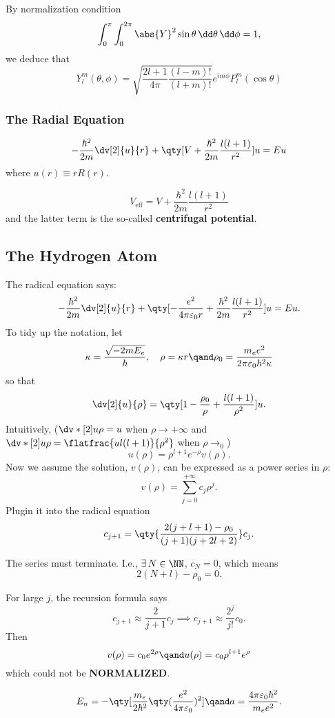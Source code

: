 By normalization condition
\[
	\int_{0}^{\pi} \int_0^{2\pi} \abs{Y}^2\sin\theta \,\dd \theta\,\dd\phi=1
,\] 
we deduce that
\begin{equation}
    Y^m_l(\theta,\phi)
	=
	\sqrt{\frac{2l+1}{4\pi}\frac{(l-m)!}{(l+m)!}}e^{im\phi}P^m_l(\cos\theta)
	\label{yml}
\end{equation}
\subsubsection{The Radial Equation}
\begin{thm}
	\[
		-\frac{\hbar^2}{2m}\dv[2]{u}{r}+\qty[V+\frac{\hbar^2}{2m}\frac{l(l+1)}{r^2}]u=Eu
	\] 
	where $u(r)\equiv rR(r)$.
\end{thm}
\begin{remark}
	\[
		V_{\mathrm{eff}}=V+\frac{\hbar^2}{2m}\frac{l(l+1)}{r^2}
	\] and the latter term is the so-called \textbf{centrifugal potential}.
\end{remark}

\subsection{The Hydrogen Atom}
The radical equation says:
\[
    	-\frac{\hbar^2}{2m}\dv[2]{u}{r}
		+
		\qty[-\frac{e^2}{4\pi \varepsilon_0r}+\frac{\hbar^2}{2m}\frac{l(l+1)}{r^2}]u
		=
		Eu
.\] 
To tidy up the notation, let
\[
	\kappa=\frac{\sqrt{-2mE_e}}{\hbar},\ \ \ 
	\rho=\kappa r \qand
	\rho_0=\frac{m_e e^2}{2\pi\varepsilon_0\hbar^2\kappa}
\] 
so that
\[
	\dv[2]{u}{\rho}=\qty[1-\frac{\rho_0}{\rho}+\frac{l(l+1)}{\rho^2}]u
.\] 
Intuitively, ($\dv*[2]{u}{\rho}=u$ when $\rho\to+\infty$ and $\dv*[2]{u}{\rho}=\flatfrac{ul(l+1)}{\rho^2}$ when $\rho\to_0$)
\[
	u(\rho)=\rho^{l+1}e^{-\rho}v(\rho)
.\] 
Now we assume the solution, $v(\rho)$, can be expressed as a power series in  $\rho$:
 \[
	 v(\rho)=\sum_{j=0}^{+\infty}c_j\rho^j
.\] 
Plugin it into the radical equation
\[
	c_{j+1}=\qty{\frac{2(j+l+1)-\rho_0}{(j+1)(j+2l+2)}}c_j
.\] 
\begin{thm}
	The series must terminate. I.e., $\exists\, N\in \NN$, $c_N=0$, which means
	\[
	    2(N+l)-\rho_0=0
	.\] 
\end{thm}
\begin{prf}
	For large $j$, the recursion formula says
	\[
		c_{j+1}\approx \frac{2}{j+1}c_j
		\implies
		c_{j+1}\approx \frac{2^j}{j!}c_0
	.\] 
	Then
	\[
		v(\rho)=c_0e^{2\rho} \qand u(\rho)=c_0\rho^{l+1}e^{\rho}
	\] 
	which could not be \textbf{NORMALIZED}.
\end{prf}
\begin{thm}
	\[
		E_n=-\qty[\frac{m_e}{2\hbar^2}\qty(\frac{e^2}{4\pi\varepsilon_0})^2]
		\qand
		a=\frac{4\pi\varepsilon_0\hbar^2}{m_e e^2}
	.\]
\end{thm}

